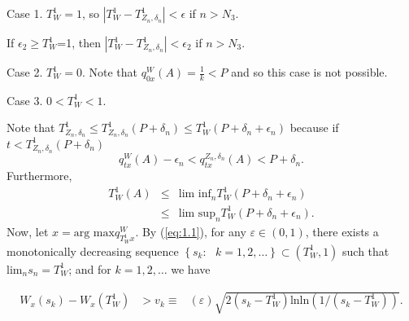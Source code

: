 \documentclass[11pt,english]{article}
\begin{document}
Case 1. $T_{W}^{1}=1$, so $\left|T_{W}^{1}-T_{Z_{n},\delta_{n}}^{1}\right|<\epsilon$
if $n>N_{3}$. 

If $\epsilon_{2}\geq T_{W}^{1}$=1, then $\left|T_{W}^{1}-T_{Z_{n},\delta_{n}}^{1}\right|<\epsilon_{2}$
if $n>N_{3}$.

Case 2. $T_{W}^{1}=0$. Note that $q_{0x}^{W}\left(A\right)=\frac{1}{k}<P$
and so this case is not possible. 

Case 3. $0<T_{W}^{1}<1$. 

Note that $T_{Z_{n},\delta_{n}}^{1}\leq T_{Z_{n},\delta_{n}}^{1}\left(P+\delta_{n}\right)\leq T_{W}^{1}\left(P+\delta_{n}+\epsilon_{n}\right)$
because if $t<T_{Z_{n},\delta_{n}}^{1}\left(P+\delta_{n}\right)$
\[
q_{tx}^{W}\left(A\right)-\epsilon_{n}<q_{tx}^{Z_{n},\delta_{n}}\left(A\right)<P+\delta_{n}.
\]
Furthermore, 
\begin{eqnarray*}
T_{W}^{1}\left(A\right) & \leq & \mbox{lim inf}_{n}T_{W}^{1}\left(P+\delta_{n}+\epsilon_{n}\right)\\
 & \leq & \mbox{lim sup}_{n}T_{W}^{1}\left(P+\delta_{n}+\epsilon_{n}\right).
\end{eqnarray*}
 Now, let $x=\mbox{arg max}q_{T_{W}^{1}x}^{W}$. By (\ref{eq:1.1}),
for any $\varepsilon\in\left(0,1\right)$, there exists a monotonically
decreasing sequence $\left\{ s_{k}:\mbox{ }k=1,2,\ldots\right\} \subset\left(T_{W}^{1},1\right)$
such that $\mbox{lim}_{n}s_{n}=T_{W}^{1}$; and for $k=1,2,\ldots$
we have

\begin{eqnarray*}
W_{x}\left(s_{k}\right)-W_{x}\left(T_{W}^{1}\right) & >v_{k}\equiv & \left(\varepsilon\right)\sqrt{2\left(s_{k}-T_{W}^{1}\right)\mbox{ln}\mbox{ln}\left(1/\left(s_{k}-T_{W}^{1}\right)\right)}.
\end{eqnarray*}
\end{document}
